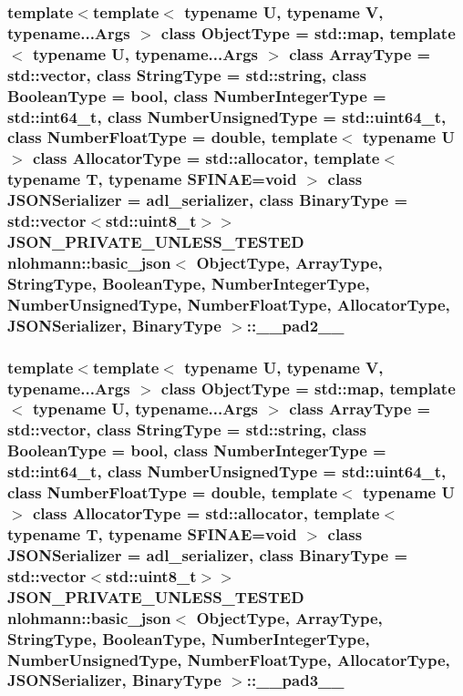 \subsubsection[{\texorpdfstring{\+\_\+\+\_\+pad2\+\_\+\+\_\+}{__pad2__}}]{\setlength{\rightskip}{0pt plus 5cm}template$<$template$<$ typename U, typename V, typename...\+Args $>$ class Object\+Type = std\+::map, template$<$ typename U, typename...\+Args $>$ class Array\+Type = std\+::vector, class String\+Type  = std\+::string, class Boolean\+Type  = bool, class Number\+Integer\+Type  = std\+::int64\+\_\+t, class Number\+Unsigned\+Type  = std\+::uint64\+\_\+t, class Number\+Float\+Type  = double, template$<$ typename U $>$ class Allocator\+Type = std\+::allocator, template$<$ typename T, typename S\+F\+I\+N\+A\+E=void $>$ class J\+S\+O\+N\+Serializer = adl\+\_\+serializer, class Binary\+Type  = std\+::vector$<$std\+::uint8\+\_\+t$>$$>$ {\bf J\+S\+O\+N\+\_\+\+P\+R\+I\+V\+A\+T\+E\+\_\+\+U\+N\+L\+E\+S\+S\+\_\+\+T\+E\+S\+T\+ED} {\bf nlohmann\+::basic\+\_\+json}$<$ Object\+Type, Array\+Type, String\+Type, Boolean\+Type, Number\+Integer\+Type, Number\+Unsigned\+Type, Number\+Float\+Type, Allocator\+Type, J\+S\+O\+N\+Serializer, Binary\+Type $>$\+::\+\_\+\+\_\+pad2\+\_\+\+\_\+\hspace{0.3cm}{\ttfamily [private]}}\hypertarget{classnlohmann_1_1basic__json_ab85f42065b70594c15de42e1f0870fba}{}\label{classnlohmann_1_1basic__json_ab85f42065b70594c15de42e1f0870fba}
\subsubsection[{\texorpdfstring{\+\_\+\+\_\+pad3\+\_\+\+\_\+}{__pad3__}}]{\setlength{\rightskip}{0pt plus 5cm}template$<$template$<$ typename U, typename V, typename...\+Args $>$ class Object\+Type = std\+::map, template$<$ typename U, typename...\+Args $>$ class Array\+Type = std\+::vector, class String\+Type  = std\+::string, class Boolean\+Type  = bool, class Number\+Integer\+Type  = std\+::int64\+\_\+t, class Number\+Unsigned\+Type  = std\+::uint64\+\_\+t, class Number\+Float\+Type  = double, template$<$ typename U $>$ class Allocator\+Type = std\+::allocator, template$<$ typename T, typename S\+F\+I\+N\+A\+E=void $>$ class J\+S\+O\+N\+Serializer = adl\+\_\+serializer, class Binary\+Type  = std\+::vector$<$std\+::uint8\+\_\+t$>$$>$ {\bf J\+S\+O\+N\+\_\+\+P\+R\+I\+V\+A\+T\+E\+\_\+\+U\+N\+L\+E\+S\+S\+\_\+\+T\+E\+S\+T\+ED} {\bf nlohmann\+::basic\+\_\+json}$<$ Object\+Type, Array\+Type, String\+Type, Boolean\+Type, Number\+Integer\+Type, Number\+Unsigned\+Type, Number\+Float\+Type, Allocator\+Type, J\+S\+O\+N\+Serializer, Binary\+Type $>$\+::\+\_\+\+\_\+pad3\+\_\+\+\_\+}\hypertarget{classnlohmann_1_1basic__json_aa52fb28bbfe1d5484808cad53c35d76c}{}\label{classnlohmann_1_1basic__json_aa52fb28bbfe1d5484808cad53c35d76c}
